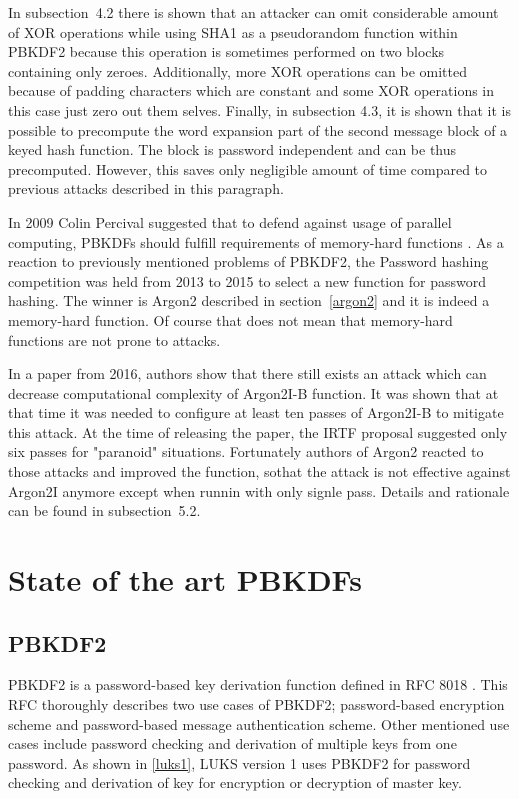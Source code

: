 \documentclass[nolof]{fithesis3}
\begin{document}
In \parencite{pbkdf2weakness}{subsection~4.2} there is shown that an attacker can omit considerable amount of XOR operations while using SHA1 as a pseudorandom function within PBKDF2 because this operation is sometimes performed on two blocks containing only zeroes. Additionally, more XOR operations can be omitted because of padding characters which are constant and some XOR operations in this case just zero out them selves. Finally, in subsection 4.3, it is shown that it is possible to precompute the word expansion part of the second message block of a keyed hash function. The block is password independent and can be thus precomputed. However, this saves only negligible amount of time compared to previous attacks described in this paragraph.

In 2009 Colin Percival suggested that to defend against usage of parallel computing, PBKDFs should fulfill requirements of memory-hard functions \parencite{memoryhard}.   As a reaction to previously mentioned problems of PBKDF2, the Password hashing competition was held from 2013 to 2015 to select a new function for password hashing. The winner is Argon2 described in section~\ref{argon2} and it is indeed a memory-hard function. Of course that does not mean that memory-hard functions are not prone to attacks.

In a paper from 2016, authors show that there still exists an attack which can decrease computational complexity of Argon2I-B function. It was shown that at that time it was needed to configure at least ten passes of Argon2I-B to mitigate this attack. At the time of releasing the paper, the IRTF proposal suggested only six passes for "paranoid" situations. Fortunately authors of Argon2 reacted to those attacks and improved the function, sothat the attack is not effective against Argon2I anymore except when runnin with only signle pass. Details and rationale can be found in \parencite{argon2}{subsection~5.2}.

\chapter{State of the art PBKDFs}
\label{chap:pbkdfs}

\section{PBKDF2}
\label{sec:pbkdf2}

PBKDF2 is a password-based key derivation function defined in RFC 8018 \parencite{rfc8018}. This RFC thoroughly describes two use cases of PBKDF2; password-based encryption scheme and password-based message authentication scheme. Other mentioned use cases include password checking and derivation of multiple keys from one password. As shown in \ref{luks1}, LUKS version 1 uses PBKDF2 for password checking and derivation of key for encryption or decryption of master key.
\end{document}
